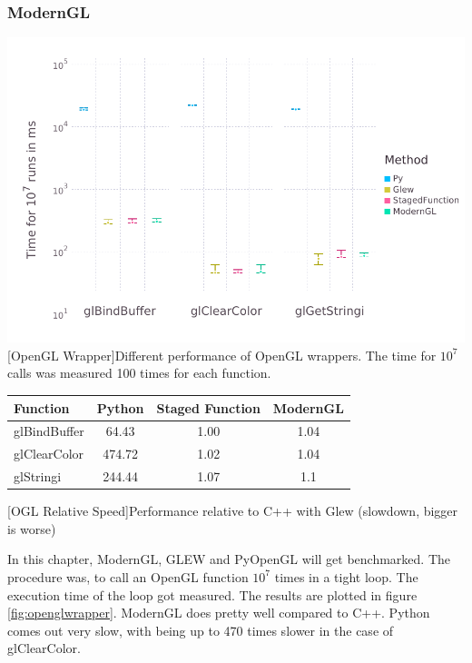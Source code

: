 \subsubsection{ModernGL}
\vspace{1em}
\begin{minipage}{\linewidth}
    \centering
    \includegraphics[width=0.9\linewidth]{graphics/glbench.pdf}
    [OpenGL Wrapper]{Different performance of OpenGL wrappers. The time for $10^7$ calls was measured 100 times for each function.}
    \label{fig:openglwrapper}
\end{minipage}
\begin{table}[htbp]
    \centering
    \begin{tabular}{l|c|c|c}
        \hline
        \textbf{Function}   & \textbf{Python}    & \textbf{Staged Function} & \textbf{ModernGL} \\
        \hline
        glBindBuffer        & 64.43              & 1.00 & 1.04 \\
        glClearColor        & 474.72             & 1.02 & 1.04 \\
        glStringi           & 244.44             & 1.07 & 1.1  \\
    \end{tabular}
    [OGL Relative Speed]{Performance relative to C++ with Glew (slowdown, bigger is worse)}
    \label{table:relativespeedoglw}
\end{table}

In this chapter, ModernGL, GLEW and PyOpenGL will get benchmarked.
The procedure was, to call an OpenGL function $10^7$ times in a tight loop. The execution time of the loop got measured.
The results are plotted in figure \ref{fig:openglwrapper}.
ModernGL does pretty well compared to C++. Python comes out very slow, with being up to 470 times slower in the case of glClearColor.

